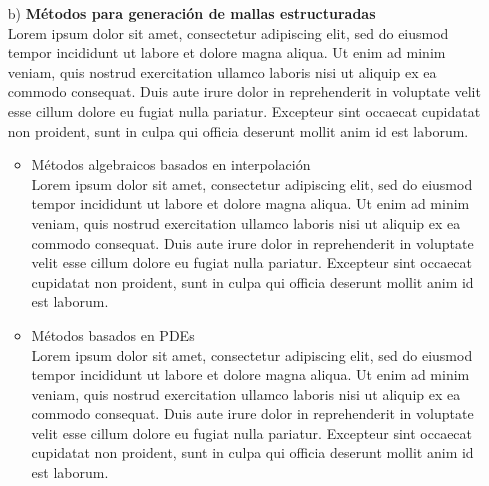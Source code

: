 \documentclass{article}
\begin{document}
\begin{enumerate}
\begin{itemize}
\item[b)] \textbf{ M\'etodos para generaci\'on de mallas estructuradas }
\\

Lorem ipsum dolor sit amet, consectetur adipiscing elit, sed do eiusmod tempor incididunt ut labore et dolore magna aliqua. Ut enim ad minim veniam, quis nostrud exercitation ullamco laboris nisi ut aliquip ex ea commodo consequat. Duis aute irure dolor in reprehenderit in voluptate velit esse cillum dolore eu fugiat nulla pariatur. Excepteur sint occaecat cupidatat non proident, sunt in culpa qui officia deserunt mollit anim id est laborum.
\\


	\begin{itemize}

		\item M\'etodos algebraicos basados en interpolaci\'on
		\\
		Lorem ipsum dolor sit amet, consectetur adipiscing elit, sed do eiusmod tempor incididunt ut labore et dolore magna aliqua. Ut enim ad minim veniam, quis nostrud exercitation ullamco laboris nisi ut aliquip ex ea commodo consequat. Duis aute irure dolor in reprehenderit in voluptate velit esse cillum dolore eu fugiat nulla pariatur. Excepteur sint occaecat cupidatat non proident, sunt in culpa qui officia deserunt mollit anim id est laborum.	
		\\

		\item M\'etodos basados en PDEs
		\\
		Lorem ipsum dolor sit amet, consectetur adipiscing elit, sed do eiusmod tempor incididunt ut labore et dolore magna aliqua. Ut enim ad minim veniam, quis nostrud exercitation ullamco laboris nisi ut aliquip ex ea commodo consequat. Duis aute irure dolor in reprehenderit in voluptate velit esse cillum dolore eu fugiat nulla pariatur. Excepteur sint occaecat cupidatat non proident, sunt in culpa qui officia deserunt mollit anim id est laborum.	


\end{itemize}
\end{itemize}
\end{enumerate}
\end{document}
